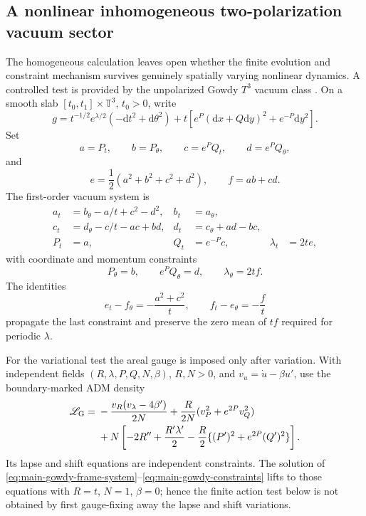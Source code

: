 \documentclass[11pt]{article}
\theoremstyle{definition}
\theoremstyle{remark}
\newcommand{\dd}{\mathrm d}
\begin{document}
\subsection{A nonlinear inhomogeneous two-polarization vacuum sector}
\label{subsec:gowdy-main}

The homogeneous calculation leaves open whether the finite evolution and
constraint mechanism survives genuinely spatially varying nonlinear dynamics.
A controlled test is provided by the unpolarized Gowdy $T^3$ vacuum class
\cite{Moncrief1981}.  On a smooth slab
$[t_0,t_1]\times\mathbb T^3$, $t_0>0$, write
\begin{equation}
 g=t^{-1/2}e^{\lambda/2}(-\dd t^2+\dd\theta^2)
 +t\left[e^P(\dd x+Q\dd y)^2+e^{-P}\dd y^2\right].
 \label{eq:main-gowdy-metric}
\end{equation}
Set
\begin{equation}
 a=P_t,\qquad b=P_\theta,\qquad
 c=e^P Q_t,\qquad d=e^P Q_\theta,
 \label{eq:main-gowdy-frame-vars}
\end{equation}
and
\begin{equation}
 e=\frac12(a^2+b^2+c^2+d^2),\qquad f=ab+cd.
 \label{eq:main-gowdy-ef}
\end{equation}
The first-order vacuum system is
\begin{align}
 a_t&=b_\theta-a/t+c^2-d^2, & b_t&=a_\theta,\nonumber\\
 c_t&=d_\theta-c/t-ac+bd, & d_t&=c_\theta+ad-bc,\nonumber\\
 P_t&=a, & Q_t&=e^{-P}c, & \lambda_t&=2te,
 \label{eq:main-gowdy-frame-system}
\end{align}
with coordinate and momentum constraints
\begin{equation}
 P_\theta=b,\qquad e^P Q_\theta=d,\qquad
 \lambda_\theta=2tf.
 \label{eq:main-gowdy-constraints}
\end{equation}
The identities
\begin{equation}
 e_t-f_\theta=-\frac{a^2+c^2}{t},\qquad
 f_t-e_\theta=-\frac ft
 \label{eq:main-gowdy-stress-identities}
\end{equation}
propagate the last constraint and preserve the zero mean of $tf$ required for
periodic $\lambda$.

For the variational test the areal gauge is imposed only after variation.  With
independent fields $(R,\lambda,P,Q,N,\beta)$, $R,N>0$, and
$v_u=\dot u-\beta u'$, use the boundary-marked ADM density
\begin{align}
 \mathscr L_{\rm G}={}&
 -\frac{v_R(v_\lambda-4\beta')}{2N}
 +\frac R{2N}(v_P^2+e^{2P}v_Q^2)\nonumber\\
 &+N\left[-2R''+\frac{R'\lambda'}2
 -\frac R2\{(P')^2+e^{2P}(Q')^2\}\right].
 \label{eq:main-gowdy-adm-density}
\end{align}
Its lapse and shift equations are independent constraints.  The solution of
\eqref{eq:main-gowdy-frame-system}--\eqref{eq:main-gowdy-constraints} lifts to
those equations with $R=t$, $N=1$, $\beta=0$; hence the finite action test below
is not obtained by first gauge-fixing away the lapse and shift variations.
\end{document}

